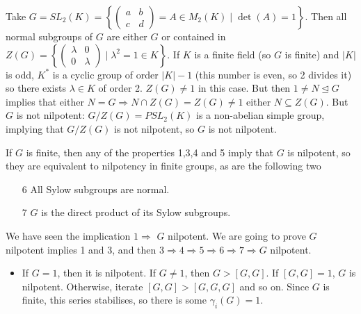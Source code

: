 \documentclass[twoside, 11pt]{article}
\begin{document}
\begin{ej}
Take $G=SL_2(K)=\left\{\begin{pmatrix}
a & b\\
c & d
\end{pmatrix}=A\in M_2(K)\mid \det(A)=1\right\}$. Then all normal subgroups of $G$ are either $G$ or contained in $Z(G)=\left\{\begin{pmatrix}
\lambda & 0\\
0 &\lambda
\end{pmatrix}\mid \lambda^2=1\in K\right\}$. If $K$ is a finite field (so $G$ is finite) and $|K|$ is odd, $K^*$ is a cyclic group of order $|K|-1$ (this number is even, so 2 divides it) so there exists $\lambda\in K$ of order 2. $Z(G)\neq 1$ in this case. But then $1\neq N\trianglelefteq G$ implies that either $N=G\Rightarrow N\cap Z(G)=Z(G)\neq 1$ either $N\subseteq Z(G)$. But $G$ is not nilpotent: $G/Z(G)=PSL_2(K)$ is a non-abelian simple group, implying that $G/Z(G)$ is not nilpotent, so $G$ is not nilpotent.
\end{ej}

\begin{teorema}
If $G$ is finite, then any of the properties 1,3,4 and 5 imply that $G$ is nilpotent, so they are equivalent to nilpotency in finite groups, as are the following two
\begin{enumerate}
\item[6] All Sylow subgroups are normal.
\item[7] $G$ is the direct product of its Sylow subgroups.
\end{enumerate}
\end{teorema}
\begin{dem}
We have seen the implication $1\Rightarrow$ $G$ nilpotent.  We are going to prove $G$ nilpotent implies  1 and 3, and then $3\Rightarrow 4\Rightarrow 5\Rightarrow 6\Rightarrow 7\Rightarrow G$ nilpotent.

\begin{itemize}
\item If $G=1$, then it is nilpotent. If $G\neq 1$, then $G>[G,G]$. If $[G,G]=1$, $G$ is nilpotent. Otherwise, iterate $[G,G]>[G,G,G]$ and so on. Since $G$ is finite, this series stabilises, so there is some $\gamma_i(G)=1$.
\end{itemize}
\end{dem}








 
\end{document}
